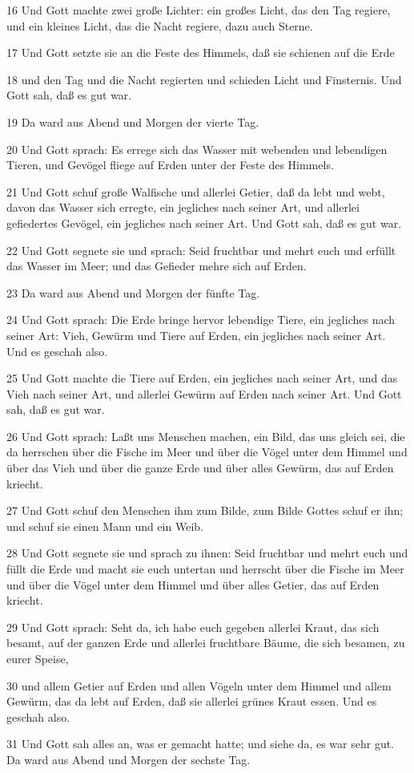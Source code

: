 \par 16 Und Gott machte zwei große Lichter: ein großes Licht, das den Tag regiere, und ein kleines Licht, das die Nacht regiere, dazu auch Sterne.
\par 17 Und Gott setzte sie an die Feste des Himmels, daß sie schienen auf die Erde
\par 18 und den Tag und die Nacht regierten und schieden Licht und Finsternis. Und Gott sah, daß es gut war.
\par 19 Da ward aus Abend und Morgen der vierte Tag.
\par 20 Und Gott sprach: Es errege sich das Wasser mit webenden und lebendigen Tieren, und Gevögel fliege auf Erden unter der Feste des Himmels.
\par 21 Und Gott schuf große Walfische und allerlei Getier, daß da lebt und webt, davon das Wasser sich erregte, ein jegliches nach seiner Art, und allerlei gefiedertes Gevögel, ein jegliches nach seiner Art. Und Gott sah, daß es gut war.
\par 22 Und Gott segnete sie und sprach: Seid fruchtbar und mehrt euch und erfüllt das Wasser im Meer; und das Gefieder mehre sich auf Erden.
\par 23 Da ward aus Abend und Morgen der fünfte Tag.
\par 24 Und Gott sprach: Die Erde bringe hervor lebendige Tiere, ein jegliches nach seiner Art: Vieh, Gewürm und Tiere auf Erden, ein jegliches nach seiner Art. Und es geschah also.
\par 25 Und Gott machte die Tiere auf Erden, ein jegliches nach seiner Art, und das Vieh nach seiner Art, und allerlei Gewürm auf Erden nach seiner Art. Und Gott sah, daß es gut war.
\par 26 Und Gott sprach: Laßt uns Menschen machen, ein Bild, das uns gleich sei, die da herrschen über die Fische im Meer und über die Vögel unter dem Himmel und über das Vieh und über die ganze Erde und über alles Gewürm, das auf Erden kriecht.
\par 27 Und Gott schuf den Menschen ihm zum Bilde, zum Bilde Gottes schuf er ihn; und schuf sie einen Mann und ein Weib.
\par 28 Und Gott segnete sie und sprach zu ihnen: Seid fruchtbar und mehrt euch und füllt die Erde und macht sie euch untertan und herrscht über die Fische im Meer und über die Vögel unter dem Himmel und über alles Getier, das auf Erden kriecht.
\par 29 Und Gott sprach: Seht da, ich habe euch gegeben allerlei Kraut, das sich besamt, auf der ganzen Erde und allerlei fruchtbare Bäume, die sich besamen, zu eurer Speise,
\par 30 und allem Getier auf Erden und allen Vögeln unter dem Himmel und allem Gewürm, das da lebt auf Erden, daß sie allerlei grünes Kraut essen. Und es geschah also.
\par 31 Und Gott sah alles an, was er gemacht hatte; und siehe da, es war sehr gut. Da ward aus Abend und Morgen der sechste Tag.

